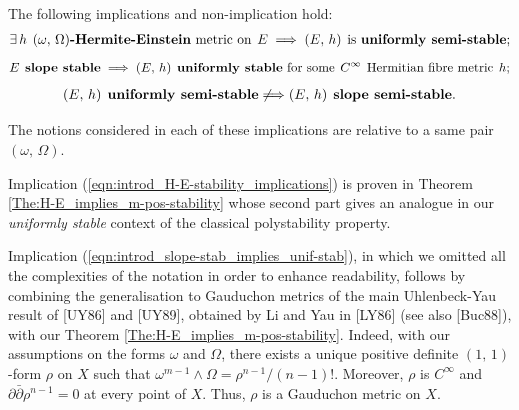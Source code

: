 \documentclass[12pt]{article}
\begin{document}
\begin{The}\label{The:introd_H-E-stability} The following implications and non-implication hold: \begin{eqnarray}\label{eqn:introd_H-E-stability_implications}\exists\, h \hspace{1ex} \mbox{{\bf $(\omega,\,\Omega)$-Hermite-Einstein} metric on}\hspace{1ex} E \implies (E,\,h) \hspace{1ex} \mbox{is {\bf uniformly semi-stable}};\end{eqnarray} \begin{eqnarray}\label{eqn:introd_slope-stab_implies_unif-stab}E \hspace{1ex} \mbox{\bf slope stable} \implies (E,\,h) \hspace{1ex} \mbox{{\bf uniformly stable} for some}\hspace{1ex} C^\infty \hspace{1ex} \mbox{Hermitian fibre metric}\hspace{1ex} h;\end{eqnarray} \begin{eqnarray}\label{eqn:introd_unif-semi-stab_not-implies_slope-semi}(E,\,h) \hspace{1ex} \mbox{\bf uniformly semi-stable} \not\Longrightarrow (E,\,h) \hspace{1ex} \mbox{{\bf slope semi-stable}}. \end{eqnarray}  

The notions considered in each of these implications are relative to a same pair $(\omega,\,\Omega)$.

\end{The}



Implication (\ref{eqn:introd_H-E-stability_implications}) is proven in Theorem \ref{The:H-E_implies_m-pos-stability} whose second part gives an analogue in our {\it uniformly stable} context of the classical polystability property.

Implication (\ref{eqn:introd_slope-stab_implies_unif-stab}), in which we omitted all the complexities of the notation in order to enhance readability, follows by combining the generalisation to Gauduchon metrics of the main Uhlenbeck-Yau result of [UY86] and [UY89], obtained by Li and Yau in [LY86] (see also [Buc88]), with our Theorem \ref{The:H-E_implies_m-pos-stability}. Indeed, with our assumptions on the forms $\omega$ and $\Omega$, there exists a unique positive definite $(1,\,1)$-form $\rho$ on $X$ such that $\omega^{m-1}\wedge\Omega = \rho^{n-1}/(n-1)!$. Moreover, $\rho$ is $C^\infty$ and $\partial\bar\partial\rho^{n-1} = 0$ at every point of $X$. Thus, $\rho$ is a Gauduchon metric on $X$.
\end{document}
